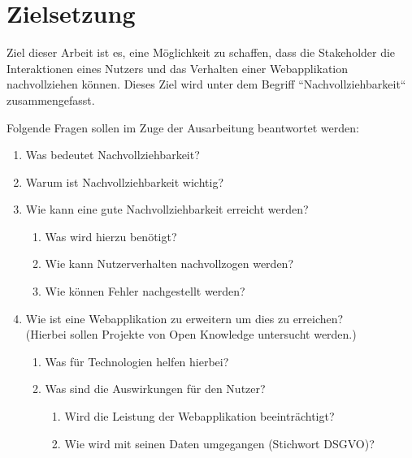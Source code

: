\section{Zielsetzung}


Ziel dieser Arbeit ist es, eine Möglichkeit zu schaffen, dass die Stakeholder die Interaktionen eines Nutzers und das Verhalten einer Webapplikation nachvollziehen können. Dieses Ziel wird unter dem Begriff ``Nachvollziehbarkeit`` zusammengefasst.

Folgende Fragen sollen im Zuge der Ausarbeitung beantwortet werden:


\begin{enumerate}
	\item Was bedeutet Nachvollziehbarkeit?
	\item Warum ist Nachvollziehbarkeit wichtig?
	\item Wie kann eine gute Nachvollziehbarkeit erreicht werden?
	\begin{enumerate}
		\item Was wird hierzu benötigt?
		\item Wie kann Nutzerverhalten nachvollzogen werden?
		\item Wie können Fehler nachgestellt werden?
	\end{enumerate}
	\item Wie ist eine Webapplikation zu erweitern um dies zu erreichen? \\ (Hierbei sollen Projekte von Open Knowledge untersucht werden.)
	\begin{enumerate}
		\item Was für Technologien helfen hierbei?
		\item Was sind die Auswirkungen für den Nutzer?
		\begin{enumerate}
			\item Wird die Leistung der Webapplikation beeinträchtigt?
			\item Wie wird mit seinen Daten umgegangen (Stichwort DSGVO)?
		\end{enumerate}
	\end{enumerate}
\end{enumerate}


